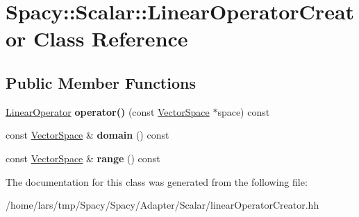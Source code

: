 \hypertarget{classSpacy_1_1Scalar_1_1LinearOperatorCreator}{}\section{Spacy\+:\+:Scalar\+:\+:Linear\+Operator\+Creator Class Reference}
\label{classSpacy_1_1Scalar_1_1LinearOperatorCreator}
\subsection*{Public Member Functions}
\begin{DoxyCompactItemize}
\item 
\hyperlink{structSpacy_1_1Scalar_1_1LinearOperator}{Linear\+Operator} {\bfseries operator()} (const \hyperlink{classSpacy_1_1VectorSpace}{Vector\+Space} $\ast$space) const \hypertarget{classSpacy_1_1Scalar_1_1LinearOperatorCreator_ac6dfc55efe19059448b54dd67ab8c9ce}{}\label{classSpacy_1_1Scalar_1_1LinearOperatorCreator_ac6dfc55efe19059448b54dd67ab8c9ce}

\item 
const \hyperlink{classSpacy_1_1VectorSpace}{Vector\+Space} \& {\bfseries domain} () const \hypertarget{classSpacy_1_1Scalar_1_1LinearOperatorCreator_a4485d5a4718ec8211eae5c74090b1331}{}\label{classSpacy_1_1Scalar_1_1LinearOperatorCreator_a4485d5a4718ec8211eae5c74090b1331}

\item 
const \hyperlink{classSpacy_1_1VectorSpace}{Vector\+Space} \& {\bfseries range} () const \hypertarget{classSpacy_1_1Scalar_1_1LinearOperatorCreator_adcd36576ce3d569e0e4709f8433cc372}{}\label{classSpacy_1_1Scalar_1_1LinearOperatorCreator_adcd36576ce3d569e0e4709f8433cc372}

\end{DoxyCompactItemize}


The documentation for this class was generated from the following file\+:\begin{DoxyCompactItemize}
\item 
/home/lars/tmp/\+Spacy/\+Spacy/\+Adapter/\+Scalar/linear\+Operator\+Creator.\+hh\end{DoxyCompactItemize}
